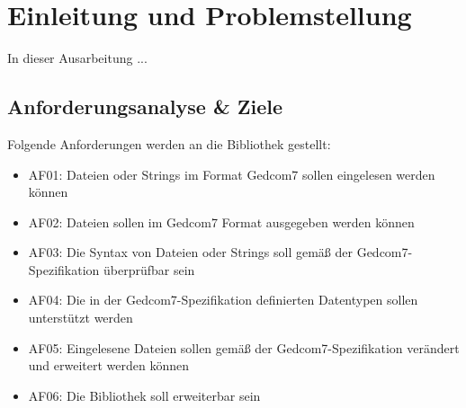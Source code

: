 \chapter{Einleitung und Problemstellung}
\label{chap: Einleitung und Problemstellung}
In dieser Ausarbeitung ...

\section{Anforderungsanalyse \& Ziele}
\label{Anforderungsanalyse und Ziele}
Folgende Anforderungen werden an die Bibliothek gestellt: 
\begin{itemize}
	\item AF01: Dateien oder Strings im Format Gedcom7 sollen eingelesen werden können
	\item AF02: Dateien sollen im Gedcom7 Format ausgegeben werden können 
	\item AF03: Die Syntax von Dateien oder Strings soll gemäß der Gedcom7-Spezifikation überprüfbar sein 
	\item AF04: Die in der Gedcom7-Spezifikation definierten Datentypen sollen unterstützt werden 
	\item AF05: Eingelesene Dateien sollen gemäß der Gedcom7-Spezifikation verändert und erweitert werden können
	\item AF06: Die Bibliothek soll erweiterbar sein  
\end{itemize}
